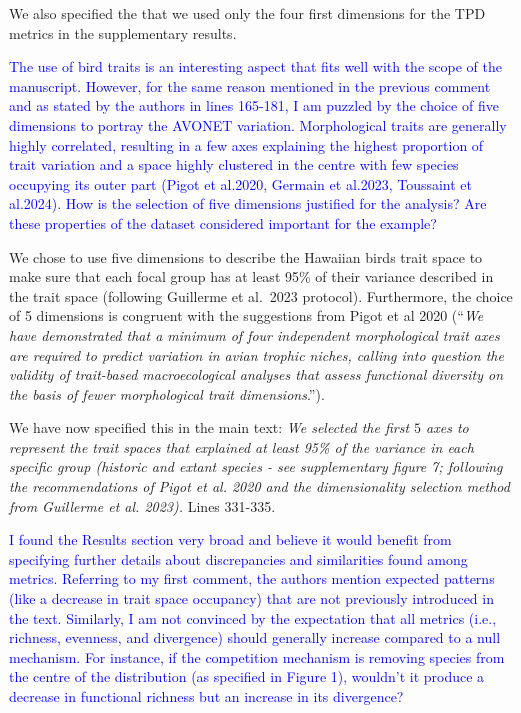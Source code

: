 \documentclass[
]{article}
\begin{document}
We also specified the that we used only the four first dimensions for the TPD metrics in the supplementary results.

\textcolor{blue}{The use of bird traits is an interesting aspect that fits well with the scope of the manuscript.
However, for the same reason mentioned in the previous comment and as stated by the authors in lines 165-181, I am puzzled by the choice of five dimensions to portray the AVONET variation.
Morphological traits are generally highly correlated, resulting in a few axes explaining the highest proportion of trait variation and a space highly clustered in the centre with few species occupying its outer part (Pigot et al.2020, Germain et al.2023, Toussaint et al.2024).
How is the selection of five dimensions justified for the analysis? Are these properties of the dataset considered important for the example?}

We chose to use five dimensions to describe the Hawaiian birds trait space to make sure that each focal group has at least 95\% of their variance described in the trait space (following Guillerme et al.~2023 protocol).
Furthermore, the choice of 5 dimensions is congruent with the suggestions from Pigot et al 2020 (``\textit{We have demonstrated that a minimum of four independent morphological trait axes are required to predict variation in avian trophic niches, calling into question the validity of trait-based macroecological analyses that assess functional diversity on the basis of fewer morphological trait dimensions}.'').

We have now specified this in the main text:
\textit{We selected the first $5$ axes to represent the trait spaces that explained at least 95\% of the variance in each specific group (historic and extant species - see supplementary figure 7; following the recommendations of Pigot et al. 2020 and the dimensionality selection method from Guillerme et al. 2023).
}
Lines 331-335.

\textcolor{blue}{I found the Results section very broad and believe it would benefit from specifying further details about discrepancies and similarities found among metrics.
Referring to my first comment, the authors mention expected patterns (like a decrease in trait space occupancy) that are not previously introduced in the text.
Similarly, I am not convinced by the expectation that all metrics (i.e., richness, evenness, and divergence) should generally increase compared to a null mechanism.
For instance, if the competition mechanism is removing species from the centre of the distribution (as specified in Figure 1), wouldn't it produce a decrease in functional richness but an increase in its divergence?}
\end{document}
